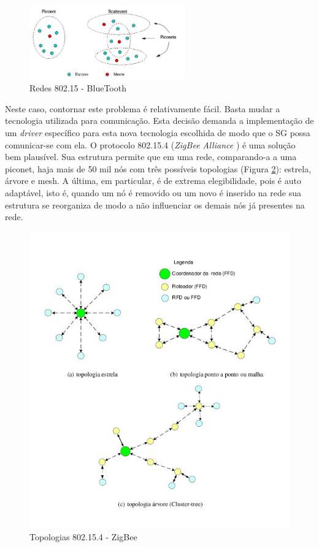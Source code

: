 \documentclass[12pt,a4paper,oneside]{report}
\begin{document}
\begin{figure}[htbp]
   \centering
    \includegraphics[width=0.6\textwidth]{figuras/scatternet}
    \caption{Redes 802.15 - BlueTooth}
    \label{fig:piconet-scatternet}
\end{figure}

Neste caso, contornar este problema é relativamente fácil. Basta mudar a tecnologia utilizada para comunicação. Esta decisão demanda a implementação de um \emph{driver} específico para esta nova tecnologia escolhida de modo que o SG possa comunicar-se com ela. O protocolo 802.15.4 (\emph{ZigBee Alliance} \cite{zigbee}) é uma solução bem plausível. Sua estrutura permite que em uma rede, comparando-a a uma piconet, haja mais de 50 mil nós com três possíveis topologias (Figura \ref{fig:topologia-zigbee}): estrela, árvore e mesh. A última, em particular, é de extrema elegibilidade, pois é auto adaptável, isto é, quando um nó é removido ou um novo é inserido na rede sua estrutura se reorganiza de modo a não influenciar os demais nós já presentes na rede.

\begin{figure}[htbp]
   \centering
    \includegraphics[width=1\textwidth]{figuras/zigbee}
    \caption{Topologias 802.15.4 - ZigBee}
    \label{fig:topologia-zigbee}
\end{figure}
\end{document}
